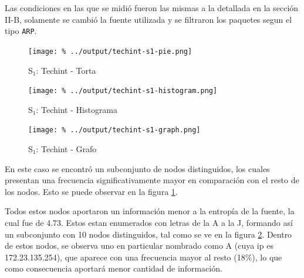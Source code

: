 \documentclass[final,inline,a4paper,narroweqnarray]{ieee}
\begin{document}
  Las condiciones en las que se midió fueron las mismas a la detallada en la
  sección II-B, solamente se cambió la fuente utilizada y se filtraron los
  paquetes segun el tipo \texttt{ARP}.  

    \begin{figure}[ht]\begin{center}
      \texttt{[image: \%
      ../output/techint-s1-pie.png]}
      \vspace{-2em}
      \caption{S$_1$: Techint - Torta}
      \label{techint-s1-pie}
    \end{center}\end{figure}

    \begin{figure}[ht]\begin{center}
      \texttt{[image: \%
      ../output/techint-s1-histogram.png]}
      \vspace{-2em}
      \caption{S$_1$: Techint - Histograma}
      \label{techint-s1-histogram}
    \end{center}\end{figure}
  
    \begin{figure}[H]\begin{center}
      \texttt{[image: \%
      ../output/techint-s1-graph.png]}
      \vspace{-2em}
      \caption{S$_1$: Techint - Grafo}
      \label{techint-s1-graph}
    \end{center}\end{figure}
  

  En este caso se encontró un subconjunto de nodos distinguidos, los cuales
  presentan una frecuencia significativamente mayor en comparación con el
  resto de los nodos. Esto se puede observar en la figura
  \ref{techint-s1-pie}. 

  Todos estos nodos aportaron un información menor a la entropía de la
  fuente, la cual fue de 4.73. Estos estan enumerados con letras de la A a
  la J, formando así un subconjunto con 10 nodos distinguidos, tal como se
  ve en la figura \ref{techint-s1-histogram}. Dentro de estos nodos, se
  observa uno en particular nombrado como A (cuya ip es 172.23.135.254), que
  aparece con una frecuencia mayor al resto (18\%), lo que como consecuencia
  aportará menor cantidad de información.
\end{document}
